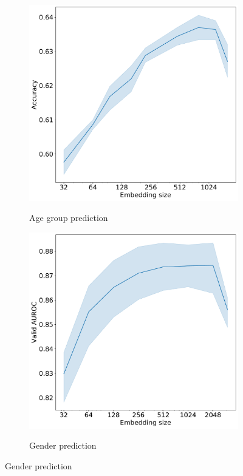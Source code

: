 \documentclass{article}
\begin{document}
\begin{figure}
  \centering
  \caption{Embedding dimensionality vs. quality}
  \begin{subfigure}{0.5\linewidth}
    \caption{Age group prediction}
    \includegraphics[width=\linewidth]{figures/age-pred-hidden-size.pdf}
    \label{fig-emb-dim-age}
  \end{subfigure}%
  \begin{subfigure}{0.5\linewidth}
    \caption{Gender prediction}
    \includegraphics[width=\linewidth]{figures/gender-hidden-size.pdf}
    \label{fig-emb-dim-gender}
  \end{subfigure}
\end{figure}
\end{document}
